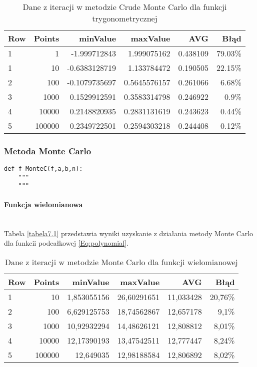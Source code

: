 \documentclass[12pt,twoside]{article}
\begin{document}
\begin{table}[H]
\centering 
\caption{Dane z iteracji w metodzie Crude Monte Carlo dla funkcji trygonometrycznej}
\label{tabela6.2}
\begin{tabular}{lrrrrr}
\toprule
{Row} &  Points &  minValue &  maxValue &       AVG &      Błąd \\
\midrule
1  &     1 & -1.999712843 &   1.999075162 & 0.438109 & 79.03\% \\
1  &     10 & -0.6383128719 &  1.133784472 & 0.190505 & 22.15\% \\
2  &     100 & -0.1079735697 &  0.5645576157 & 0.261066 & 6.68\% \\
3  &     1000 & 0.1529912591 &   0.3583314798 & 0.246922 & 0.9\% \\
4  &     10000 & 0.2148820935 &  0.2831131619 & 0.243623 & 0.44\% \\
5  &     100000 & 0.2349722501 &  0.2594303218 & 0.244408 & 0.12\% \\
\bottomrule
\end{tabular}
\end{table}


\subsubsection{Metoda Monte Carlo}

\begin{lstlisting}[caption={Kod w języku python implementujący metodę Monte Carlo}]
def f_MonteC(f,a,b,n):
    """
    """
\end{lstlisting}
\label{Listing 11}

\paragraph{Funkcja wielomianowa}\mbox{} \\

Tabela \eqref{tabela7.1} przedstawia wyniki uzyskanie z działania metody Monte Carlo dla funkcii podcałkowej \eqref{Eq:polynomial}.

\begin{table}[H]
\centering 
\caption{Dane z iteracji w metodzie Monte Carlo dla funkcji wielomianowej}
\label{tabela7.1}
\begin{tabular}{lrrrrr}
\toprule
{Row} &  Points &  minValue &  maxValue &       AVG &      Błąd \\
\midrule
1  &     10 & 1,853055156 &   26,60291651 & 11,033428 & 20,76\% \\
2  &     100 & 6,629125753 &  18,74562867 & 12,657178 & 9,1\% \\
3  &     1000 & 10,92932294 &   14,48626121 & 12,808812 & 8,01\% \\
4  &     10000 & 12,17390193 &  13,47542511 & 12,777447 & 8,24\% \\
5  &     100000 & 12,649035 &  12,98188584 & 12,806892& 8,02\% \\
\bottomrule
\end{tabular}
\end{table}
\end{document}
